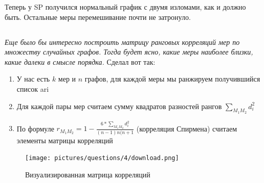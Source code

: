 \documentclass{article}
\begin{document}
Теперь у SP получился нормальный график с двумя изломами, как и должно быть. Остальные меры перемешивание почти не затронуло.

\subsection{}
\textit{Еще было бы интересно построить матрицу ранговых корреляций мер по множеству случайных графов.
Тогда будет ясно, какие меры наиболее близки, какие далеки в смысле порядка.}
Сделал вот так:
\begin{enumerate}
\item У нас есть $k$ мер и $n$ графов, для каждой меры мы ранжируем получившийся список ari 
\item Для каждой пары мер считаем сумму квадратов разностей рангов $\sum_{M_1M_2} d_i^2$
\item По формуле $r_{M_1M_2} = 1 - \frac{6 * \sum_{M_1M_2} d_i^2}{(n-1)n(n+1}$ (корреляция Спирмена) считаем элементы матрицы корреляций
\end{enumerate}

\begin{figure}[H]
	\texttt{[image: pictures/questions/4/download.png]}
	\caption{\label{f_vs2} Визуализированная матрица корреляций}
\end{figure}
\end{document}
